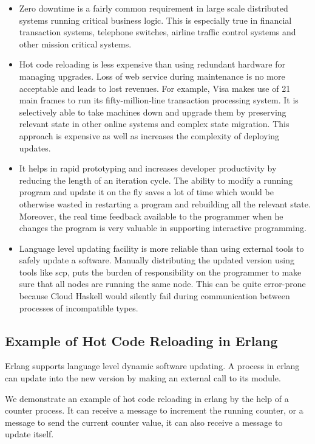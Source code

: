 \begin{itemize}
\item Zero downtime is a fairly common requirement in large scale
  distributed systems running critical business logic. This is
  especially true in financial transaction systems, telephone
  switches, airline traffic control systems and other mission
  critical systems.
\item Hot code reloading is less expensive than using redundant
  hardware for managing upgrades. Loss of web service during
  maintenance is no more acceptable and leads to lost revenues. For
  example, Visa makes use of 21 main frames to run its
  fifty-million-line transaction processing system. It is selectively
  able to take machines down and upgrade them by preserving relevant
  state in other online systems and complex state migration. This
  approach is expensive as well as increases the complexity of
  deploying updates.
\item It helps in rapid prototyping and increases developer
  productivity by reducing the length of an iteration cycle. The
  ability to modify a running program and update it on the fly saves a
  lot of time which would be otherwise wasted in restarting a program
  and rebuilding all the relevant state. Moreover, the real time
  feedback available to the programmer when he changes the program is
  very valuable in supporting interactive programming.
\item Language level updating facility is more reliable than using
  external tools to safely update a software. Manually distributing
  the updated version using tools like scp, puts the burden of
  responsibility on the programmer to make sure that all nodes are
  running the same node. This can be quite error-prone because Cloud
  Haskell would silently fail during communication between processes
  of incompatible types.
\end{itemize}

\subsection{Example of Hot Code Reloading in Erlang}

Erlang supports language level dynamic software updating. A process in
erlang can update into the new version by making an external call to
its module.

We demonstrate an example of hot code reloading in erlang by the help
of a counter process. It can receive a message to increment the
running counter, or a message to send the current counter value, it
can also receive a message to update itself.

